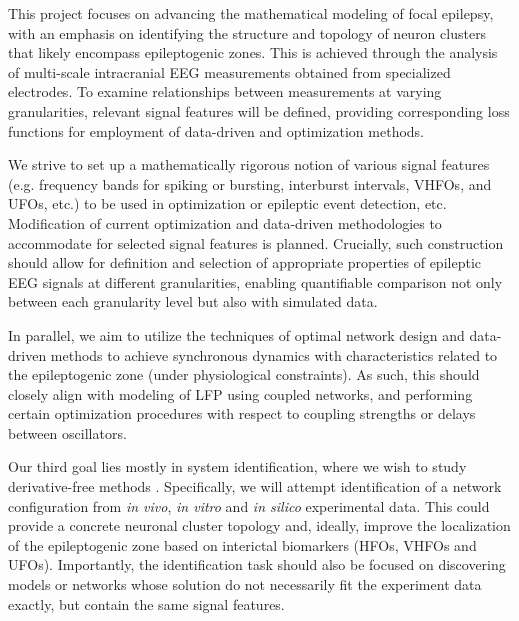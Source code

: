 \documentclass[a4paper,11pt]{scrartcl}
\begin{document}

This project focuses on advancing the mathematical modeling of focal epilepsy, with an emphasis on identifying the structure and topology of neuron clusters that likely encompass epileptogenic zones. This is achieved through the analysis of multi-scale intracranial \ac{EEG} measurements obtained from specialized electrodes. To examine relationships between measurements at varying granularities, relevant signal features will be defined, providing corresponding loss functions for employment of data-driven and optimization methods.

We strive to set up a mathematically rigorous notion of various signal features (e.g. frequency bands for spiking or bursting, interburst intervals, \acp{VHFO}, and \acp{UFO}, etc.) \cite{Wedler2022} to be used in optimization or epileptic event detection, etc. Modification of current optimization and data-driven methodologies to accommodate for selected signal features is planned. Crucially, such construction should allow for definition and selection of appropriate properties of epileptic \ac{EEG} signals at different granularities, enabling quantifiable comparison not only between each granularity level but also with simulated data.

In parallel, we aim to utilize the techniques of optimal network design and data-driven methods \cite{Baggio2021} to achieve synchronous dynamics with characteristics related to the epileptogenic zone (under physiological constraints). As such, this should closely align with modeling of \ac{LFP} using coupled networks, and performing certain optimization procedures with respect to coupling strengths or delays between oscillators. 

Our third goal lies mostly in system identification, where we wish to study derivative-free methods \cite{Bortz2023, Messenger2024}. Specifically, we will attempt identification of a network configuration from \textit{in vivo}, \textit{in vitro} and \textit{in silico} experimental data. This could provide a concrete neuronal cluster topology and, ideally, improve the localization of the epileptogenic zone based on interictal biomarkers (\acp{HFO}, \acp{VHFO} and \acp{UFO}). Importantly, the identification task should also be focused on discovering models or networks whose solution do not necessarily fit the experiment data exactly, but contain the same signal features.
\end{document}

